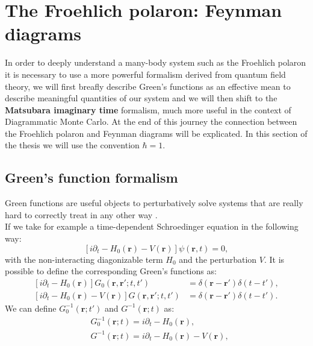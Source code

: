 \documentclass[12pt, a4paper]{report}
\numberwithin{equation}{section}
\begin{document}
\chapter{The Froehlich polaron: Feynman diagrams}
In order to deeply understand a many-body system such as the Froehlich polaron it is necessary to use a more powerful formalism 
derived from quantum field theory, we will first breafly describe Green's functions as an effective mean to describe meaningful quantities of 
our system and we will then shift to the \textbf{Matsubara imaginary time} formalism, much more useful in the context of Diagrammatic Monte Carlo.
At the end of this journey the connection between the Froehlich polaron and Feynman diagrams will be explicated. In this section of the thesis 
we will use the convention $\hbar=1$.
\section{Green's function formalism}
Green functions are useful objects to perturbatively solve systems that are really hard to correctly treat in any other way \cite{bruus2004many}.\\
If we take for example a time-dependent Schroedinger equation in the following way:
\begin{equation}
    \left[i\partial_t - H_0(\mathbf{r})-V(\mathbf{r})\right]\psi(\mathbf{r},t)=0,
    \label{Schroedinger_eq_hamiltonian}
\end{equation}
with the non-interacting diagonizable term $H_0$ and the perturbation $V$. It is possible to define the corresponding Green's functions as:
\begin{equation}
\begin{split}
    \left[i\partial_t -H_0(\mathbf{r})\right]G_0(\mathbf{r},\mathbf{r}';t,t')&=\delta(\mathbf{r}-\mathbf{r}')\delta(t-t'),\\
    \left[i\partial_t -H_0(\mathbf{r})-V(\mathbf{r})\right]G(\mathbf{r},\mathbf{r}';t,t')&=\delta(\mathbf{r}-\mathbf{r}')\delta(t-t').
\end{split}
\end{equation}
We can define $G_0^{-1}(\mathbf{r};t')$ and $G^{-1}(\mathbf{r};t)$ as:
\begin{equation}
\begin{split}
    &G_0^{-1}(\mathbf{r};t)=i\partial_t-H_0(\mathbf{r}),\\
    &G^{-1}(\mathbf{r};t)=i\partial_t-H_0(\mathbf{r})-V(\mathbf{r}),
\end{split}
\label{GF_solving_eq}
\end{equation}
\end{document}
